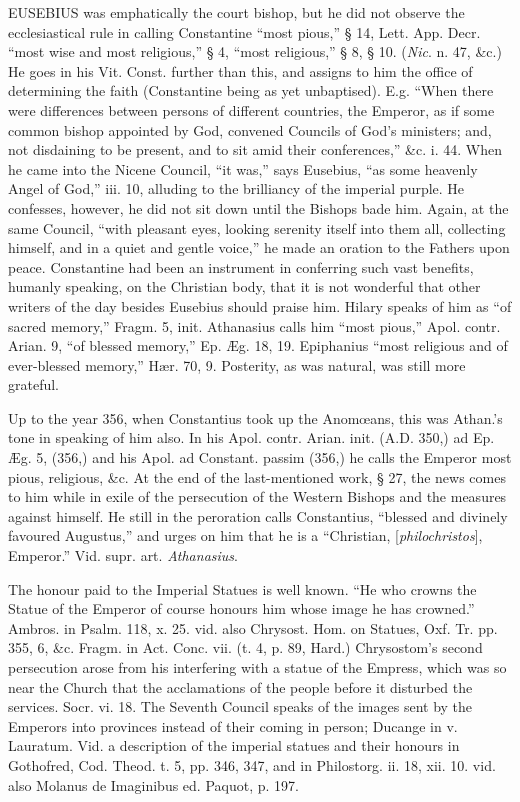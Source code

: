 EUSEBIUS was emphatically the court bishop, but he did not observe
the ecclesiastical rule in calling Constantine ``most pious,'' § 14,
Lett. App. Decr. ``most wise and most religious,'' § 4, ``most
religious,'' § 8, § 10. (\emph{Nic}. n. 47, \&c.) He goes in his
Vit. Const. further than this, and assigns to him the office of
determining the faith (Constantine being as yet unbaptised). E.g. ``When
there were differences between persons of different countries, the
Emperor, as if some common bishop appointed by God, convened Councils
of God's ministers; and, not disdaining to be present, and to sit amid
their conferences,'' \&c. i. 44. When he came into the Nicene
Council, ``it was,'' says Eusebius, ``as some heavenly Angel of God,''
iii. 10, alluding to the brilliancy of the imperial purple. He
confesses, however, he did not sit down until the Bishops bade him.
Again, at the same Council, ``with pleasant eyes, looking serenity
itself into them all, collecting himself, and in a quiet and gentle
voice,'' he made an oration to the Fathers upon peace. Constantine had
been an instrument in conferring such vast benefits, humanly speaking,
on the Christian body, that it is not wonderful that other writers of
the day besides Eusebius should praise him. Hilary speaks of him as ``of
sacred memory,'' Fragm. 5, init. Athanasius calls him ``most
pious,'' Apol. contr. Arian. 9, ``of blessed memory,'' Ep. Æg. 18, 19.
Epiphanius ``most religious and of ever-blessed memory,'' Hær. 70, 9.
Posterity, as was natural, was still more grateful.

Up to the year 356, when Constantius took up the
Anomœans, this was Athan.'s tone in speaking of him also. In his Apol.
contr. Arian. init. (A.D.
350,) ad Ep. Æg. 5, (356,) and his Apol. ad Constant. passim (356,)
he calls the Emperor most pious, religious, \&c. At the end of the
last-mentioned work, § 27, the news comes to him while in exile of
the persecution of the Western Bishops and the measures against
himself. He still in the peroration calls Constantius, ``blessed and
divinely favoured Augustus,'' and urges on him that he is a ``Christian,
[\emph{philochristos}], Emperor.'' Vid. supr. art. \emph{Athanasius}.

The honour paid to the Imperial Statues is well
known. ``He who crowns the Statue of the Emperor of course honours him
whose image he has crowned.'' Ambros. in Psalm. 118, x. 25. vid. also
Chrysost. Hom. on Statues, Oxf. Tr. pp. 355, 6, \&c. Fragm. in Act.
Conc. vii. (t. 4, p. 89, Hard.) Chrysostom's second persecution arose
from his interfering with a statue of the Empress, which was so near
the Church that the acclamations of the people before it disturbed the
services. Socr. vi. 18. The Seventh Council speaks of the images sent
by the Emperors into provinces instead of their coming in person;
Ducange in v. Lauratum. Vid. a description of the imperial statues and
their honours in Gothofred, Cod. Theod. t. 5, pp. 346, 347, and in
Philostorg. ii. 18, xii. 10. vid. also Molanus de Imaginibus ed.
Paquot, p. 197.

